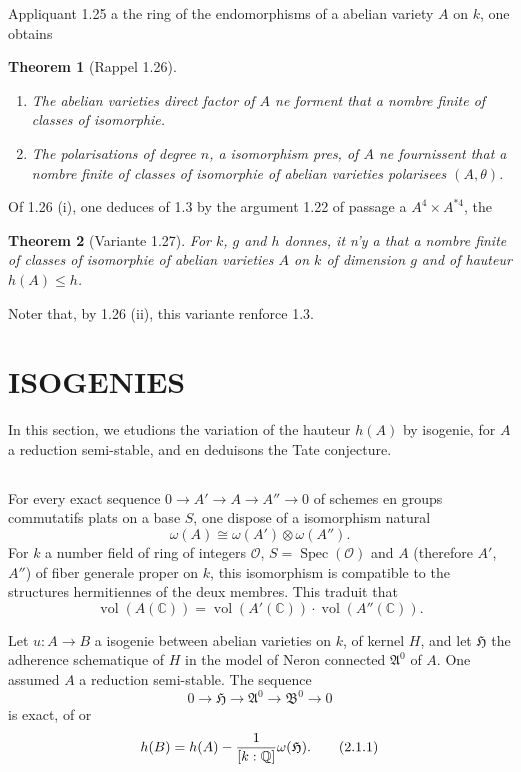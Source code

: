 \documentclass[12pt,a4paper]{article}
\theoremstyle{plain}
\newtheorem{theorem}{Theorem}[section]
\theoremstyle{definition}
\theoremstyle{remark}
\DeclareMathOperator{\Spec}{Spec}
\DeclareMathOperator{\vol}{vol}
\newcommand{\CC}{\mathbb{C}}
\newcommand{\QQ}{\mathbb{Q}}
\newcommand{\cO}{\mathcal{O}}
\newcommand{\fA}{\mathfrak{A}}
\let\deg\relax
\providecommand{\CC}{\mathbb{C}}
\providecommand{\QQ}{\mathbb{Q}}
\providecommand{\cO}{\mathcal{O}}
\providecommand{\fA}{\mathfrak{A}}
\providecommand{\fB}{\mathfrak{B}}
\providecommand{\fH}{\mathfrak{H}}
\providecommand{\Spec}{\operatorname{Spec}}
\begin{document}
Appliquant 1.25 a the ring of the endomorphisms of a abelian variety $A$ on $k$, one obtains

\begin{theorem}[Rappel 1.26]
\begin{enumerate}[label=(\roman*)]
\item The abelian varieties direct factor of $A$ ne forment that a nombre finite of classes of isomorphie.
\item The polarisations of degree $n$, a isomorphism pres, of $A$ ne fournissent that a nombre finite of classes of isomorphie of abelian varieties polarisees $(A,\theta)$.
\end{enumerate}
\end{theorem}

Of 1.26 (i), one deduces of 1.3 by the argument 1.22 of passage a $A^4 \times A^{*4}$, the

\begin{theorem}[Variante 1.27]
For $k$, $g$ and $h$ donnes, it n'y a that a nombre finite of classes of isomorphie of abelian varieties $A$ on $k$ of dimension $g$ and of hauteur $h(A) \leq h$.
\end{theorem}

Noter that, by 1.26 (ii), this variante renforce 1.3.


\section{ISOGENIES}

In this section, we etudions the variation of the hauteur $h(A)$ by isogenie, for $A$ a reduction semi-stable, and en deduisons the Tate conjecture.

\subsection{}

For every exact sequence $0 \to A' \to A \to A'' \to 0$ of schemes en groups commutatifs plats on a base $S$, one dispose of a isomorphism natural
\[
\omega(A) \cong \omega(A') \otimes \omega(A'').
\]
For $k$ a number field of ring of integers $\cO$, $S = \Spec(\cO)$ and $A$ (therefore $A'$, $A''$) of fiber generale proper on $k$, this isomorphism is compatible to the structures hermitiennes of the deux membres. This traduit that
\[
\vol(A(\CC)) = \vol(A'(\CC)) \cdot \vol(A''(\CC)).
\]

Let $u : A \to B$ a isogenie between abelian varieties on $k$, of kernel $H$, and let $\fH$ the adherence schematique of $H$ in the model of Neron connected $\fA^0$ of $A$. One assumed $A$ a reduction semi-stable. The sequence
\[
0 \to \fH \to \fA^0 \to \fB^0 \to 0
\]
is exact, of or
\[
h(B) = h(A) - \frac{1}{[k:\QQ]} \deg \omega(\fH). \tag{2.1.1}
\]
\end{document}
